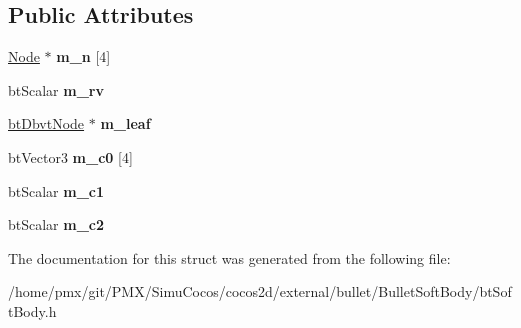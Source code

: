 \subsection*{Public Attributes}
\begin{DoxyCompactItemize}
\item 
\mbox{\label{structbtSoftBody_1_1Tetra_aff3ff48a28a068a8dd469a5da4dbf8f8}} 
\hyperlink{structbtSoftBody_1_1Node}{Node} $\ast$ {\bfseries m\+\_\+n} \mbox{[}4\mbox{]}
\item 
\mbox{\label{structbtSoftBody_1_1Tetra_a5e86059848aa6610b4013ba4b4ab0b0e}} 
bt\+Scalar {\bfseries m\+\_\+rv}
\item 
\mbox{\label{structbtSoftBody_1_1Tetra_acbc2265499f6f0308050178c5ead8a44}} 
\hyperlink{structbtDbvtNode}{bt\+Dbvt\+Node} $\ast$ {\bfseries m\+\_\+leaf}
\item 
\mbox{\label{structbtSoftBody_1_1Tetra_a86961488ba36f4d17359dd2eddfd04cd}} 
bt\+Vector3 {\bfseries m\+\_\+c0} \mbox{[}4\mbox{]}
\item 
\mbox{\label{structbtSoftBody_1_1Tetra_a07bcbc0ba6dadb35227f43998e08efdf}} 
bt\+Scalar {\bfseries m\+\_\+c1}
\item 
\mbox{\label{structbtSoftBody_1_1Tetra_ac0417913135b5a98dc6733e35967e5df}} 
bt\+Scalar {\bfseries m\+\_\+c2}
\end{DoxyCompactItemize}


The documentation for this struct was generated from the following file\+:\begin{DoxyCompactItemize}
\item 
/home/pmx/git/\+P\+M\+X/\+Simu\+Cocos/cocos2d/external/bullet/\+Bullet\+Soft\+Body/bt\+Soft\+Body.\+h\end{DoxyCompactItemize}
